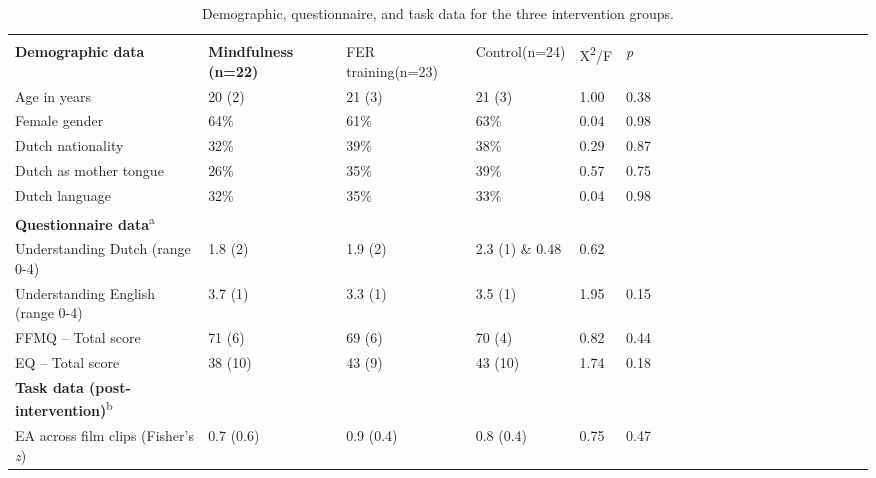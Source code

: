 \documentclass[authordate, empirical]{jote-new-article}
\begin{document}
\begin{table}
    \begin{fullwidth}
    \caption{Demographic, questionnaire, and task data for the three intervention groups.}
    \begin{tabularx}{\linewidth}{@{} l l l l l l l l l l l l l l l l l l l l l  @{}}
         \multicolumn{6}{l}{}
        \\

        \textbf{Demographic data} & \textbf{Mindfulness (n=22)} & FER training(n=23)
        & Control(n=24) & X\textsuperscript{2}/F & \emph{p} \\

         Age in years & 20 (2) & 21 (3) & 21 (3) & 1.00 & 0.38 \\

         Female gender & 64\% & 61\% & 63\% & 0.04 & 0.98 \\

         Dutch nationality & 32\% & 39\% & 38\% & 0.29 & 0.87 \\

         Dutch as mother tongue & 26\% & 35\% & 39\% & 0.57 & 0.75 \\

         Dutch language & 32\% & 35\% & 33\% & 0.04 & 0.98 \\

         \textbf{Questionnaire data}\textsuperscript{a} \\

         Understanding Dutch (range 0-4) & 1.8 (2) & 1.9 (2) & 2.3 (1) \& 0.48 & 0.62
        \\

         Understanding English (range 0-4) & 3.7 (1) & 3.3 (1) & 3.5 (1) & 1.95 & 0.15
        \\

         FFMQ – Total score & 71 (6) & 69 (6) & 70 (4) & 0.82 & 0.44 \\

         EQ – Total score & 38 (10)  & 43 (9) & 43 (10) & 1.74 & 0.18 \\

         \textbf{Task data (post-intervention)}\textsuperscript{b} &  &  &  &
        &  \\

         EA across film clips (Fisher’s \emph{z}) & 0.7 (0.6) & 0.9 (0.4) & 0.8 (0.4)
        & 0.75 & 0.47 \\


\end{tabularx}
\end{fullwidth}
\end{table}
\end{document}
